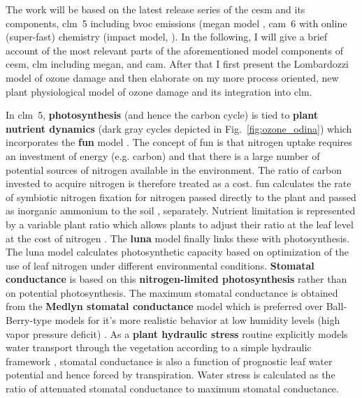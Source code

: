 The work will be based on the latest release series of the \gls{cesm} and its components, \gls{clm}~5 including \gls{bvoc} emissions (\gls{megan} model \parencite{ACP:Guenther2006}, \gls{cam}~6 with online (super-fast) chemistry (\gls{impact} model, \textcite{JGR:Rotman2004}). 
In the following, I will give a brief account of the most relevant parts of the aforementioned model components of \gls{cesm}, \gls{clm} including \gls{megan}, and \gls{cam}. After that I first present the Lombardozzi model of ozone damage and then elaborate on my more process oriented, new plant physiological model of ozone damage and its integration into \gls{clm}.

In \gls{clm}~5, \textbf{photosynthesis} (and hence the carbon cycle) is tied to \textbf{\color{darkgray}plant nutrient dynamics} (dark gray cycles depicted in Fig.~\ref{fig:ozone_odina}) which incorporates the \textbf{\gls{fun}} model \parencites{GBC:Fisher2010}{JGR:Brzostek2014}{GCB:Shi2015}. The concept of \gls{fun} is that nitrogen uptake requires an investment of energy (e.g. carbon) and that there is a large number of potential sources of nitrogen available in the environment. The ratio of carbon invested to acquire nitrogen is therefore treated as a cost. \gls{fun} calculates the rate of symbiotic nitrogen fixation for nitrogen passed directly to the plant and passed as inorganic ammonium to the soil \parencite{GBC:Cleveland1999}, separately. Nutrient limitation is represented by a variable plant  ratio which allows plants to adjust their  ratio at the leaf level at the cost of nitrogen \parencite{JAMES:Ghimire2016}. The \textbf{\gls{luna}} model \parencites{STE:Xu2019}{GMD:Ali2016} finally links these with photosynthesis. The \gls{luna} model calculates photosynthetic capacity based on optimization of the use of leaf nitrogen under different environmental conditions. \textbf{Stomatal conductance} is based on this \textbf{\color{darkgray}nitrogen-limited photosynthesis} rather than on potential photosynthesis. The maximum stomatal conductance is obtained from the \textbf{Medlyn stomatal conductance} model \parencite{GCB:Medlyn2011} which is preferred over Ball-Berry-type models \parencite{BallBerry1987} for it’s more realistic behavior at low humidity levels (high vapor pressure deficit) \parencites{PR:Rogers2013}{NP:Rogers2017}.  
As a \textbf{\color{blue}plant hydraulic stress} routine explicitly models water transport through the vegetation according to a simple hydraulic framework \parencite{JAMES:Kennedy2019}, stomatal conductance is also a function of prognostic leaf water potential and hence forced by transpiration. Water stress is calculated as the ratio of attenuated stomatal conductance to maximum stomatal conductance.

